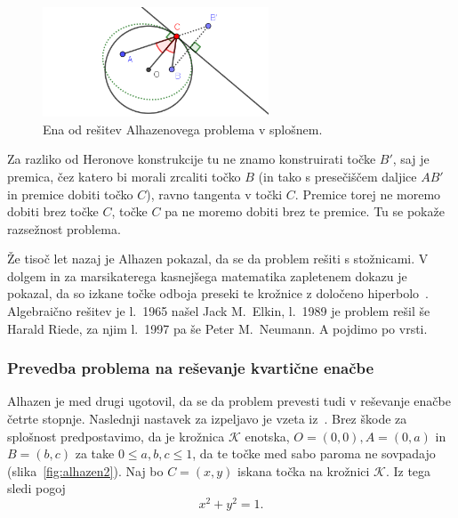 \begin{figure}[h]
    \centering
    \includegraphics[width=0.6\textwidth]{images/alhazen/alhazen1.png}
    \caption[Alhazenov problem]{Ena od rešitev Alhazenovega problema v splošnem.}
    \label{fig:alhazen1}
\end{figure}

Za razliko od Heronove konstrukcije tu ne znamo konstruirati točke $B'$, saj je premica, čez katero bi morali zrcaliti točko $B$ (in tako s presečiščem daljice $AB'$ in premice dobiti točko $C$), ravno tangenta v točki $C$. Premice torej ne moremo dobiti brez točke $C$, točke $C$ pa ne moremo dobiti brez te premice. Tu se pokaže razsežnost problema.

Že tisoč let nazaj je Alhazen pokazal, da se da problem rešiti s stožnicami. V dolgem in za marsikaterega kasnejšega matematika zapletenem dokazu je pokazal, da so izkane točke odboja preseki te krožnice z določeno hiperbolo~\cite{wilk2015}. Algebraično rešitev je l.\ 1965 našel Jack M.\ Elkin, l.\ 1989 je problem rešil še Harald Riede, za njim l.\ 1997 pa še Peter M.\ Neumann. A pojdimo po vrsti.


\subsubsection*{Prevedba problema na reševanje kvartične enačbe}

Alhazen je med drugi ugotovil, da se da problem prevesti tudi v reševanje enačbe četrte stopnje. Naslednji nastavek za izpeljavo je vzeta iz~\cite[138--139]{geometricconstructions}. Brez škode za splošnost predpostavimo, da je krožnica $\mathcal{K}$ enotska, $O = (0,0), A = (0,a)$ in $B=(b,c)$ za take $0 \leq a, b, c \leq 1$, da te točke med sabo paroma ne sovpadajo (slika~\ref{fig:alhazen2}). Naj bo $C=(x,y)$ iskana točka na krožnici $\mathcal{K}$. Iz tega sledi pogoj
\begin{equation}
    \label{eq:pogoj_alh1}
    x^2 + y^2 = 1.
\end{equation}

